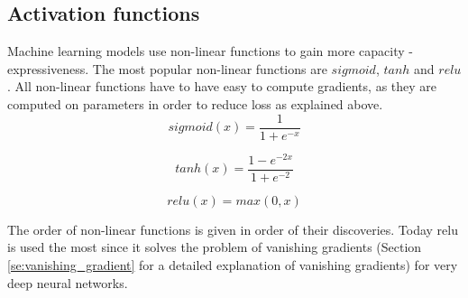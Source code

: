 \documentclass[times, utf8, diplomski]{fer}
\begin{document}
\subsection{Activation functions} \label{se:activation_functions}
Machine learning models use non-linear functions to gain more capacity - expressiveness. The most popular non-linear functions are $sigmoid$, $tanh$ and $relu$. All non-linear functions have to have easy to compute gradients, as they are computed on parameters in order to reduce loss as explained above. 
\begin{equation} \label{eq:sigmoid}
    sigmoid(x) = \frac{1}{1 + e^{-x}}
\end{equation}

\begin{equation} \label{eq:tanh}
    tanh(x) = \frac{1 - e^{-2x}}{1 + e^{-2}}
\end{equation}

\begin{equation} \label{eq:relu}
    relu(x) = max(0, x)
\end{equation}

The order of non-linear functions is given in order of their discoveries. Today relu is used the most since it solves the problem of vanishing gradients (Section \ref{se:vanishing_gradient} for a detailed explanation of vanishing gradients) for very deep neural networks.
\end{document}
